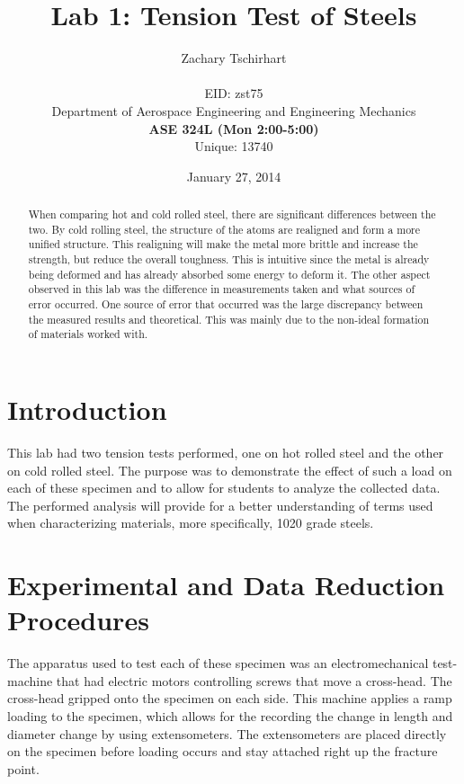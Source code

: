 \documentclass[12pt]{report}
\title{Lab 1: Tension Test of Steels}
\author{Zachary Tschirhart \\
	\small \\
        \small EID: zst75 \\
	\small Department of Aerospace Engineering and Engineering Mechanics \\
	\small \textbf{ASE 324L (Mon 2:00-5:00)} \\
	\small Unique: 13740}
\date{January 27, 2014}
\begin{document}
\maketitle

\begin{abstract}
When comparing hot and cold rolled steel, there are significant differences between the two. By cold rolling steel, the structure of the atoms are realigned and form a more unified structure. This realigning will make the metal more brittle and increase the strength, but reduce the overall toughness. This is intuitive since the metal is already being deformed and has already absorbed some energy to deform it. The other aspect observed in this lab was the difference in measurements taken and what sources of error occurred. One source of error that occurred was the large discrepancy between the measured results and theoretical. This was mainly due to the non-ideal formation of materials worked with. 
\end{abstract}


\tableofcontents
\pagebreak

\setcounter{secnumdepth}{0}



\section{Introduction}
\doublespacing

This lab had two tension tests performed, one on hot rolled steel and the other on cold rolled steel. The purpose was to demonstrate the effect of such a load on each of these specimen and to allow for students to analyze the collected data. The performed analysis will provide for a better understanding of terms used when characterizing materials, more specifically, 1020 grade steels.   

\section{Experimental and Data Reduction Procedures}

The apparatus used to test each of these specimen was an electromechanical test-machine that had electric motors controlling screws that move a cross-head. The cross-head gripped onto the specimen on each side. This machine applies a ramp loading to the specimen, which allows for the recording the change in length and diameter change by using extensometers. The extensometers are placed directly on the specimen before loading occurs and stay attached right up the fracture point. 
\end{document}
